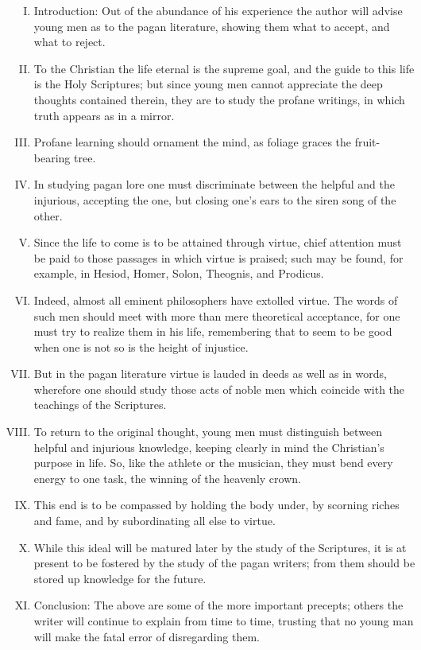 \documentclass[a4paper]{article}
\begin{document}
\begin{enumerate}[I.]
 
 \item Introduction: Out of the abundance of his experience the author will advise young men as to the pagan literature, showing them what to accept, and what to reject.
 
 \item To the Christian the life eternal is the supreme goal, and the guide to this life is the Holy Scriptures; but since young men cannot appreciate the deep thoughts contained therein, they are to study the profane writings, in which truth appears as in a mirror.
 
 \item Profane learning should ornament the mind, as foliage graces the fruit-bearing tree.
 
 \item In studying pagan lore one must discriminate between the helpful and the injurious, accepting the one, but closing one's ears to the siren song of the other.
 
 \item Since the life to come is to be attained through virtue, chief attention must be paid to those passages in which virtue is praised; such may be found, for example, in Hesiod, Homer, Solon, Theognis, and Prodicus.
 
 \item Indeed, almost all eminent philosophers have extolled virtue. The words of such men should meet with more than mere theoretical acceptance, for one must try to realize them in his life, remembering that to seem to be good when one is not so is the height of injustice.
 
 \item But in the pagan literature virtue is lauded in deeds as well as in words, wherefore one should study those acts of noble men which coincide with the teachings of the Scriptures.
 
 \item To return to the original thought, young men must distinguish between helpful and injurious knowledge, keeping clearly in mind the Christian's purpose in life. So, like the athlete or the musician, they must bend every energy to one task, the winning of the heavenly crown.
 
 \item This end is to be compassed by holding the body under, by scorning riches and fame, and by subordinating all else to virtue. 
 
 \item While this ideal will be matured later by the study of the Scriptures, it is at present to be fostered by the study of the pagan writers; from them should be stored up knowledge for the future.
 
 \item Conclusion: The above are some of the more important precepts; others the writer will continue to explain from time to time, trusting that no young man will make the fatal error of disregarding them. 
 
\end{enumerate}
\end{document}
